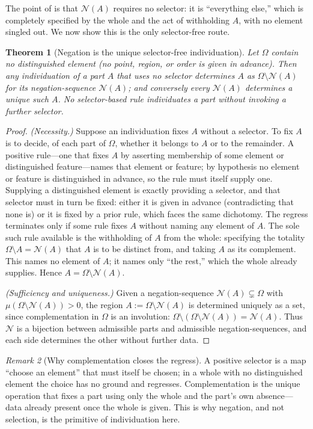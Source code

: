 \documentclass[11pt,a4paper]{article}
\theoremstyle{thmstyle}
\newtheorem{theorem}{Theorem}[section]
\theoremstyle{definition}
\theoremstyle{remark}
\newtheorem{remark}[theorem]{Remark}
\newcommand{\Space}{\Omega}
\newcommand{\Neg}{\mathcal{N}}
\begin{document}
The point of  is that $\Neg(A)$ requires no selector: it is
``everything else,'' which is completely specified by the whole and the act of
withholding $A$, with no element singled out. We now show this is the only
selector-free route.

\begin{theorem}[Negation is the unique selector-free individuation]
\label{thm:negation-unique}
Let $\Space$ contain no distinguished element \textup{(}no point, region, or
order is given in advance\textup{)}. Then any individuation of a part $A$ that
uses no selector determines $A$ as $\Space\setminus\Neg(A)$ for its
negation-sequence $\Neg(A)$; and conversely every $\Neg(A)$ determines a unique
such $A$. No selector-based rule individuates a part without invoking a further
selector.
\end{theorem}

\begin{proof}
\emph{(Necessity.)} Suppose an individuation fixes $A$ without a selector. To
fix $A$ is to decide, of each part of $\Space$, whether it belongs to $A$ or to
the remainder. A positive rule---one that fixes $A$ by asserting membership of
some element or distinguished feature---names that element or feature; by
hypothesis no element or feature is distinguished in advance, so the rule must
itself supply one. Supplying a distinguished element is exactly providing a
selector, and that selector must in turn be fixed: either it is given in advance
(contradicting that none is) or it is fixed by a prior rule, which faces the same
dichotomy. The regress terminates only if some rule fixes $A$ without naming any
element of $A$. The sole such rule available is the withholding of $A$ from the
whole: specifying the totality $\Space\setminus A=\Neg(A)$ that $A$ is to be
distinct from, and taking $A$ as its complement. This names no element of $A$;
it names only ``the rest,'' which the whole already supplies. Hence
$A=\Space\setminus\Neg(A)$.

\emph{(Sufficiency and uniqueness.)} Given a negation-sequence
$\Neg(A)\subsetneq\Space$ with $\mu(\Space\setminus\Neg(A))>0$, the region
$A:=\Space\setminus\Neg(A)$ is determined uniquely as a set, since complementation
in $\Space$ is an involution: $\Space\setminus(\Space\setminus\Neg(A))=\Neg(A)$.
Thus $\Neg$ is a bijection between admissible parts and admissible
negation-sequences, and each side determines the other without further data.
\end{proof}

\begin{remark}[Why complementation closes the regress]
\label{rem:regress}
A positive selector is a map ``choose an element'' that must itself be chosen; in
a whole with no distinguished element the choice has no ground and regresses.
Complementation is the unique operation that fixes a part using only the whole
and the part's own absence---data already present once the whole is given. This
is why negation, and not selection, is the primitive of individuation here.
\end{remark}
\end{document}
